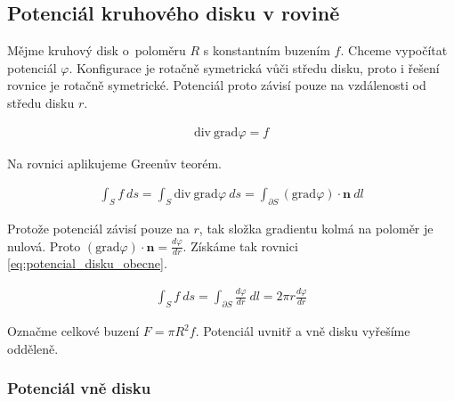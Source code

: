 \documentclass{book}
\newcommand{\vect}[1]{\boldsymbol{#1}}
\newcommand{\grad}{\mathrm{grad}}
\newcommand{\diverg}{\mathrm{div}}
\begin{document}
\subsection{Potenciál kruhového disku v rovině}

Mějme kruhový disk o~poloměru \(R\) s konstantním buzením \(f\). Chceme vypočítat potenciál \(\varphi\). Konfigurace je rotačně symetrická vůči středu
disku, proto i řešení rovnice je rotačně symetrické. Potenciál proto závisí pouze na vzdálenosti od středu disku \(r\).




\begin{equation}
\begin{split}
\diverg \ \grad \varphi = f
\end{split}
\end{equation}

Na rovnici aplikujeme Greenův teorém.

\begin{equation}
\begin{split}
\int_S f \ ds = \int_S \diverg \ \grad \varphi \ ds = \int_{\partial S} (\grad \varphi) \cdot \vect{n} \ dl
\end{split}
\end{equation}

Protože potenciál závisí pouze na \(r\), tak složka gradientu kolmá na poloměr je nulová. Proto \((\grad \varphi) \cdot \vect{n} = \frac{d \varphi}{dr}\).
Získáme tak rovnici \eqref{eq:potencial_disku_obecne}.

\begin{equation}
\label{eq:potencial_disku_obecne}
\begin{split}
\int_S f \ ds = \int_{\partial S} \frac{d \varphi}{dr} \ dl = 2 \pi r \frac{d \varphi}{dr}
\end{split}
\end{equation}

Označme celkové buzení \(F = \pi R^2 f\).
Potenciál uvnitř a vně disku vyřešíme odděleně.

\subsubsection{Potenciál vně disku}
\end{document}
